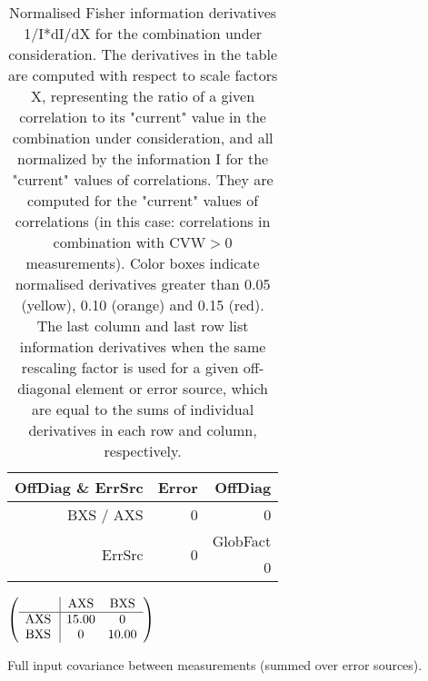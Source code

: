 \begin{table}[H]
\scriptsize
\begin{center}
\renewcommand{\arraystretch}{1.1}
\begin{tabular}{|r|r|r|}
\hline
 OffDiag \& ErrSrc & {\tiny Error} & OffDiag\\
\hline
BXS / AXS &  0 &  0 \\
\hline
\multirow{2}{*}{ErrSrc} & \multirow{2}{*}{ 0} & GlobFact\\
 & &  0 \\
\hline
\end{tabular}
\renewcommand{\arraystretch}{1}
\caption{Normalised Fisher information derivatives 1/I*dI/dX for the combination under consideration. The derivatives in the table are computed with respect to scale factors X, representing the ratio of a given correlation to its "current" value in the combination under consideration, and all normalized by the information I for the "current" values of correlations. They are computed for the "current" values of correlations (in this case: correlations in combination with CVW$>$0 measurements). Color boxes indicate normalised derivatives greater than 0.05 (yellow), 0.10 (orange) and 0.15 (red). The last column and last row list information derivatives when the same rescaling factor is used for a given off-diagonal element or error source, which are equal to the sums of individual derivatives in each row and column, respectively.}
\end{center}
\end{table}
\begin{table}[H]
\scriptsize
\begin{center}
\renewcommand{\arraystretch}{1.1}
\begin{math}\left(\begin{array}{c|cc}
 & \mathrm{AXS} & 
\mathrm{BXS} \\
\hline
\mathrm{AXS} \hspace*{2pt} &      15.00 &  0 \\
\mathrm{BXS} \hspace*{2pt} &  0 &      10.00 \\
\end{array}\right)\end{math}
\caption{Full input covariance between measurements (summed over error sources).}
\renewcommand{\arraystretch}{1}
\end{center}
\end{table}
